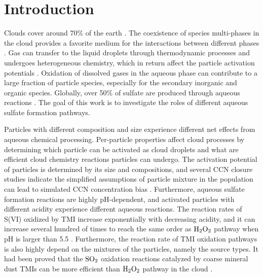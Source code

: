 \documentclass[edeposit,fullpage]{uiucthesis2009}
\begin{document}
\label{chap2:mon}
\section{Introduction}

Clouds cover around 70$\%$ of the earth \citep{Stubenrauch2013}. The coexistence of species multi-phases in the cloud provides a favorite medium for the interactions between different phases \citep{Deguillaume2005}. Gas can transfer to the liquid droplets through thermodynamic processes and undergoes heterogeneous chemistry, which in return affect the particle activation potentials \citep{Farmer2015, Henning2014}. Oxidation of dissolved gases in the aqueous phase can contribute to a large fraction of particle species, especially for the secondary inorganic and organic species. Globally, over 50\% of sulfate are produced through aqueous reactions \citep{Philip2014, Roth2016}. The goal of this work is to investigate the roles of different aqueous sulfate formation pathways. 

Particles with different composition and size experience different net effects from aqueous chemical processing. Per-particle properties affect cloud processes by determining which particle can be activated as cloud droplets and what are efficient cloud chemistry reactions particles can undergo. The activation potential of particles is determined by its size and compositions, and several CCN closure studies indicate the simplified assumptions of particle mixture in the population can lead to simulated CCN concentration bias \citep{Broekhuizen2006, Bhattu2015}. Furthermore, aqueous sulfate formation reactions are highly pH-dependent, and activated particles with different acidity experience different aqueous reactions. The reaction rates of S(VI) oxidized by TMI increase exponentially with decreasing acidity, and it can increase several hundred of times to reach the same order as $\rm H_2O_2$ pathway when pH is larger than 5.5 \citep{Seinfeld2006a}. Furthermore, the reaction rate of TMI oxidation pathways is also highly depend on the mixtures of the particles, namely the source types. It had been proved that the $\rm SO_2$ oxidation reactions catalyzed by coarse mineral dust TMIs can be more efficient than $\rm H_2O_2$ pathway in the cloud \citep{Harris2013a, Harris2014}. 
\end{document}
